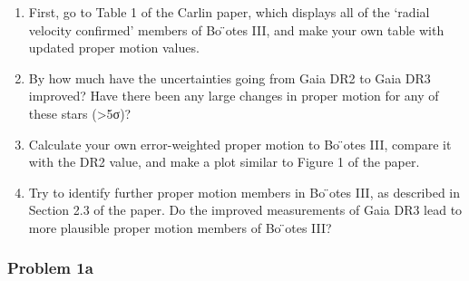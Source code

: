\documentclass[11pt]{article}
\begin{document}
\begin{enumerate}
\def\labelenumi{\alph{enumi}.}
\item
  First, go to Table 1 of the Carlin paper, which displays all of the
  `radial velocity confirmed' members of Bo ̈otes III, and make your own
  table with updated proper motion values.
\item
  By how much have the uncertainties going from Gaia DR2 to Gaia DR3
  improved? Have there been any large changes in proper motion for any
  of these stars (\textgreater5σ)? \textbar{}
\item
  Calculate your own error-weighted proper motion to Bo ̈otes III,
  compare it with the DR2 value, and make a plot similar to Figure 1 of
  the paper.
\item
  Try to identify further proper motion members in Bo ̈otes III, as
  described in Section 2.3 of the paper. Do the improved measurements of
  Gaia DR3 lead to more plausible proper motion members of Bo ̈otes III?
\end{enumerate}

\subsubsection{Problem 1a}\label{problem-1a}
\end{document}
